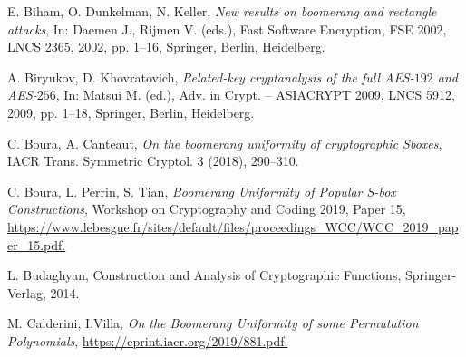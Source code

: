 \documentclass[11pt]{article}
\begin{document}
 
 \begin{thebibliography}{99}
 


E. Biham, O. Dunkelman, N. Keller, {\em New results on boomerang and rectangle attacks}, In: Daemen J., Rijmen V. (eds.), Fast Software Encryption, FSE 2002, LNCS 2365, 2002, pp. 1--16, Springer, Berlin, Heidelberg.

A. Biryukov, D. Khovratovich, {\em Related-key cryptanalysis of the full AES-$192$ and AES-$256$},  In: Matsui M. (ed.),  Adv. in Crypt. -- ASIACRYPT 2009,  LNCS 5912, 2009, pp. 1--18, Springer, Berlin, Heidelberg.
 


C. Boura, A. Canteaut, {\em On the boomerang uniformity of cryptographic Sboxes}, IACR Trans. Symmetric Cryptol. 3 (2018),  290--310.

C. Boura, L. Perrin, S. Tian, {\em Boomerang Uniformity of Popular S-box
Constructions},  Workshop on Cryptography and Coding 2019, Paper 15,
\url{https://www.lebesgue.fr/sites/default/files/proceedings\_WCC/WCC\_2019\_paper\_15.pdf.}


L. Budaghyan, Construction and Analysis of Cryptographic Functions, Springer-Verlag, 2014.


M. Calderini, I.Villa,
{\em On the Boomerang Uniformity of some Permutation Polynomials}, 
\url{https://eprint.iacr.org/2019/881.pdf.}


\end{thebibliography}
\end{document}
